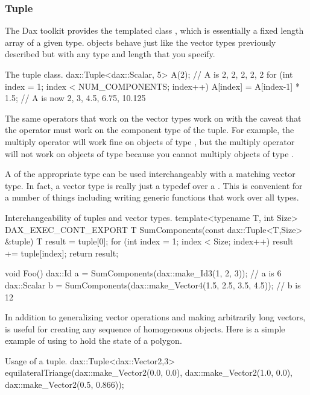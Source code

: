 \subsubsection{Tuple}

The Dax toolkit provides the templated class ,
which is essentially a fixed length array of a given type. 
objects behave just like the vector types previously described but with any
type and length that you specify.

\begin{daxexample}{The tuple class.}
dax::Tuple<dax::Scalar, 5> A(2);  // A is {2, 2, 2, 2, 2}
for (int index = 1; index < NUM_COMPONENTS; index++)
  {
  A[index] = A[index-1] * 1.5;
  }
// A is now {2, 3, 4.5, 6.75, 10.125}
\end{daxexample}

The same operators that work on the vector types work on  with
the caveat that the operator must work on the component type of the
tuple. For example, the multiply operator will work fine on objects of type
, but the multiply operator will not work on objects
of type  because you cannot multiply
objects of type .

A  of the appropriate type can be used interchangeably with a
matching vector type. In fact, a vector type is really just a typedef over
a . This is convenient for a number of things including writing
generic functions that work over all types.

\begin{daxexample}{Interchangeability of tuples and vector types.}
template<typename T, int Size>
DAX_EXEC_CONT_EXPORT
T SumComponents(const dax::Tuple<T,Size> &tuple)
{
  T result = tuple[0];
  for (int index = 1; index < Size; index++)
    {
    result += tuple[index];
    }
  return result;
}

void Foo()
{
  dax::Id a = SumComponents(dax::make_Id3(1, 2, 3));                    // a is 6
  dax::Scalar b = SumComponents(dax::make_Vector4(1.5, 2.5, 3.5, 4.5)); // b is 12
}
\end{daxexample}

In addition to generalizing vector operations and making arbitrarily long
vectors,  is useful for creating any sequence of homogeneous
objects. Here is a simple example of using  to hold the state of
a polygon.

\begin{daxexample}{Usage of a tuple.}
dax::Tuple<dax::Vector2,3> equilateralTriange(dax::make_Vector2(0.0, 0.0),
                                              dax::make_Vector2(1.0, 0.0),
                                              dax::make_Vector2(0.5, 0.866));
\end{daxexample}


